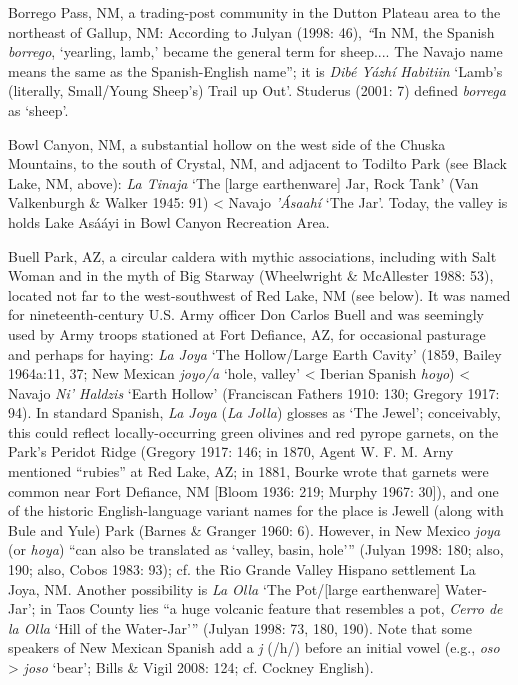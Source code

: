 Borrego Pass, NM, a trading-post community in the Dutton Plateau area to the northeast of Gallup, NM:  According to Julyan (1998: 46), \textit{“}In NM, the Spanish \textit{borrego}, ‘yearling, lamb,’ became the general term for sheep....  The Navajo name means the same as the Spanish-English name”; it is \textit{Dibé Yázhí} \textit{Habitiin} ‘Lamb’s (literally, Small/Young Sheep’s) Trail up Out’.  Studerus (2001: 7) defined \textit{borrega} as ‘sheep’.

Bowl Canyon, NM, a substantial hollow on the west side of the Chuska Mountains, to the south of Crystal, NM, and adjacent to Todilto Park (see Black Lake, NM, above):  \textit{La Tinaja }‘The [large earthenware] Jar, Rock Tank’ (Van Valkenburgh \& Walker 1945: 91) {\textless} Navajo \textit{{}'Ásaahí} ‘The Jar’.  Today, the valley is holds Lake Asááyi in Bowl Canyon Recreation Area.

Buell Park, AZ, a circular caldera with mythic associations, including with Salt Woman and in the myth of Big Starway (Wheelwright \& McAllester 1988: 53), located not far to the west-southwest of Red Lake, NM (see below).  It was named for nineteenth-century U.S. Army officer Don Carlos Buell and was seemingly used by Army troops stationed at Fort Defiance, AZ, for occasional pasturage and perhaps for haying:  \textit{La Joya} ‘The Hollow/Large Earth Cavity’ (1859, Bailey 1964a:11, 37; New Mexican \textit{joyo/a} ‘hole, valley’ {\textless} Iberian Spanish \textit{hoyo}) {\textless} Navajo \textit{Ni' Haldzis} ‘Earth Hollow’ (Franciscan Fathers 1910: 130; Gregory 1917: 94).  In standard Spanish, \textit{La Joya} (\textit{La Jolla}) glosses as ‘The Jewel’; conceivably, this could reflect locally-occurring green olivines and red pyrope garnets, on the Park’s Peridot Ridge (Gregory 1917: 146; in 1870, Agent W. F. M. Arny mentioned “rubies” at Red Lake, AZ; in 1881, Bourke wrote that garnets were common near Fort Defiance, NM [Bloom 1936: 219; Murphy 1967: 30]), and one of the historic English-language variant names for the place is Jewell (along with Bule and Yule) Park (Barnes \& Granger 1960: 6).  However, in New Mexico \textit{joya} (or \textit{hoya}) “can also be translated as `valley, basin, hole’” (Julyan 1998: 180; also, 190; also, Cobos 1983: 93); cf. the Rio Grande Valley Hispano settlement La Joya, NM.  Another possibility is \textit{La Olla} ‘The Pot/[large earthenware] Water-Jar’; in Taos County lies “a huge volcanic feature that resembles a pot, \textit{Cerro de la Olla} ‘Hill of the Water-Jar’” (Julyan 1998: 73, 180, 190).  Note that some speakers of New Mexican Spanish add a \textit{j} (/h/) before an initial vowel (e.g., \textit{oso} {\textgreater} \textit{joso} ‘bear’; Bills \& Vigil 2008: 124; cf. Cockney English).

